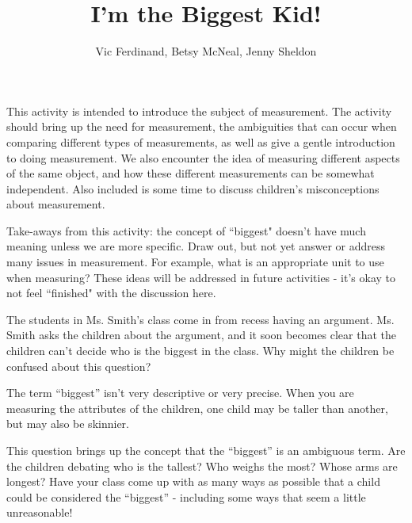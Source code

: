 \documentclass[]{ximera}
\title{I'm the Biggest Kid!}
\author{Vic Ferdinand, Betsy McNeal, Jenny Sheldon}
\begin{document}
\begin{abstract}\end{abstract}
\maketitle

\begin{instructorIntro}

This activity is intended to introduce the subject of measurement.  The activity should bring up the need for measurement, the ambiguities that can occur when comparing different types of measurements, as well as give a gentle introduction to doing measurement.  We also encounter the idea of measuring different aspects of the same object, and how these different measurements can be somewhat independent.  Also included is some time to discuss children's misconceptions about measurement.

Take-aways from this activity: the concept of ``biggest" doesn't have much meaning unless we are more specific.  Draw out, but not yet answer or address many issues in measurement.  For example, what is an appropriate unit to use when measuring?  These ideas will be addressed in future activities - it's okay to not feel ``finished" with the discussion here.


\end{instructorIntro}

\begin{problem}
    The students in Ms. Smith's class come in from recess having an argument.  Ms. Smith asks the children about the argument, and it soon becomes clear that the children can't decide who is the biggest in the class.  Why might the children be confused about this question?
    
    \begin{solution}
    The term ``biggest'' isn't very descriptive or very precise.  When you are measuring the attributes of the children, one child may be taller than another, but may also be skinnier.
    \end{solution}
    
    \begin{instructorNotes}
        This question brings up the concept that the ``biggest'' is an ambiguous term.  Are the children debating who is the tallest?  Who weighs the most?  Whose arms are longest?  Have your class come up with as many ways as possible that a child could be considered the ``biggest'' - including some ways that seem a little unreasonable!
    \end{instructorNotes}
\end{problem}
\end{document}

